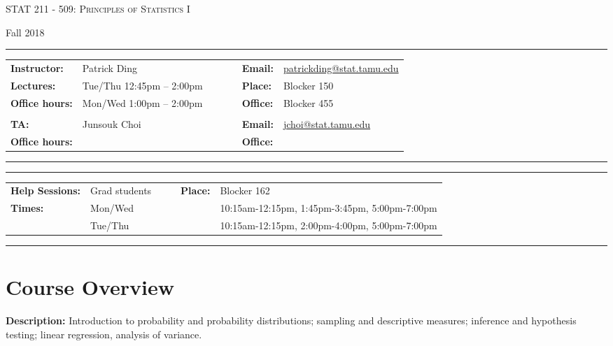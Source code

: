 \documentclass[11pt, a4paper]{article}
\begin{document}
\begin{center}
{\Large \textsc{STAT 211 - 509: Principles of Statistics I}}
\end{center}
\begin{center}
Fall 2018
\end{center}

\begin{center}
\rule{\textwidth}{0.4pt}
\begin{minipage}[t]{\textwidth}
\begin{tabular}{llcccll}
\textbf{Instructor:} & Patrick Ding & & &  & \textbf{Email:} & \url{patrickding@stat.tamu.edu} 
\\
\textbf{Lectures:} &  Tue/Thu 12:45pm -- 2:00pm & & & & \textbf{Place:} & Blocker 150
\\
\textbf{Office hours:} & Mon/Wed 1:00pm -- 2:00pm   & & & & \textbf{Office:} & Blocker 455
\\\\
\textbf{TA:} & Junsouk Choi & & & & \textbf{Email:} & \url{jchoi@stat.tamu.edu}
\\
\textbf{Office hours:} &    & & & & \textbf{Office:} & 
\end{tabular}
\end{minipage}
\rule{\textwidth}{0.4pt}
\end{center}

\begin{center}
\rule{\textwidth}{0.4pt}
\begin{minipage}[t]{\textwidth}
\begin{tabular}{llccll}
\textbf{Help Sessions:} & Grad students & & & \textbf{Place:} & Blocker 162
\\
\textbf{Times:} & Mon/Wed & & & & 10:15am-12:15pm, 1:45pm-3:45pm, 5:00pm-7:00pm
\\
 & Tue/Thu & & & & 10:15am-12:15pm, 2:00pm-4:00pm, 5:00pm-7:00pm
\end{tabular}
\end{minipage}
\rule{\textwidth}{0.4pt}
\end{center}

\section{Course Overview}

\noindent\textbf{Description:} 
Introduction to probability and probability distributions; sampling and descriptive measures; inference and hypothesis testing; linear regression, analysis of variance. 
\end{document}
